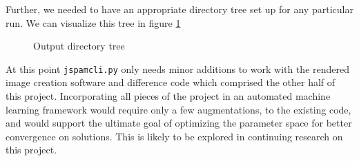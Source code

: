 Further, we needed to have an appropriate directory tree set up for any
particular run. We can visualize this tree in figure \ref{fig: the_tree}
\begin{figure}[h!]
    \caption[Output directory tree]{Output directory tree}
    \label{fig: the_tree}
\end{figure}


At this point \texttt{jspamcli.py} only needs minor additions to work with
the rendered image creation software and difference code which comprised the
other half of this project. Incorporating all pieces of the project in an
automated machine learning framework would require only a few augmentations,
to the existing code, and would support the ultimate goal of optimizing
the parameter space for better convergence on solutions.
This is likely to be explored in continuing research on this project.


